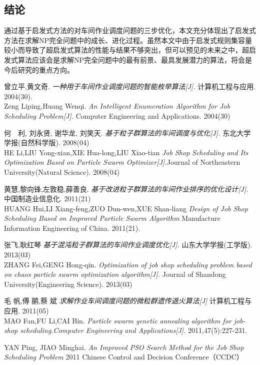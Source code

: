 \documentclass[UTF8]{ctexart}
\begin{document}
\begin{multicols}{2}
\section{结论}
	通过基于启发式方法的对车间作业调度问题的三步优化，本文充分体现出了启发式方法在求解NP完全问题中的成长、进化过程。虽然本文中由于启发式规则集容量较小而导致了超启发式算法的性能与结果不够突出，但可以预见的未来之中，超启发式算法应该会是求解NP完全问题中的最有前景、最具发展潜力的算法，将会是今后研究的重点方向。
\end{multicols}

\medskip
\begin{thebibliography}{9}
曾立平,黄文奇.
\textit{一种用于车间作业调度问题的智能枚举算法[J].} 
计算机工程与应用. 2004(30).\\
Zeng Liping,Huang Wenqi.
\textit{An Intelligent Enumeration Algorithm for Job Scheduling Problem[J].}
Computer Engineering and Applications. 2004(30)

何　利, 刘永贤, 谢华龙, 刘笑天.
\textit{基于粒子群算法的车间调度与优化[J].}
 东北大学学报(自然科学版). 2008(04)\\
HE Li,LIU Yong-xian,XIE Hua-long,LIU Xiao-tian
\textit{Job Shop Scheduling and Its Optimization Based on Particle
Swarm Optimizer[J].}Journal of Northeastern University(Natural Science). 2008(04)
 
黄慧,黎向锋,左敦稳,薛善良.
\textit{基于改进粒子群算法的车间作业排序的优化设计[J].}
中国制造业信息化. 2011(21)\\
HUANG Hui,LI Xiang-feng,ZUO Dun-wen,XUE Shan-liang
\textit{Design of Job Shop Scheduling Based on Improved Particle Swarm Algorithm}
Manufacture Information Engineering of China. 2011(21).

张飞,耿红琴
\textit{基于混沌粒子群算法的车间作业调度优化[J].}
山东大学学报(工学版). 2013(03)\\
ZHANG Fei,GENG Hong-qin.
\textit{Optimization of job shop scheduling problem based on chaos particle swarm optimization algorithm[J].}
Journal of Shandong University(Engineering Science). 2013(03)

毛 帆,傅 鹂,蔡 斌
\textit{求解作业车间调度问题的微粒群遗传退火算法[J]}
计算机工程与应用. 2011(05)\\
MAO Fan,FU Li,CAI Bin.
\textit{Particle swarm genetic annealing algorithm for job-shop scheduling.Computer Engineering and Applications[J].}
2011,47(5):227-231.

YAN Ping, JIAO Minghai.
\textit{An Improved PSO Search Method for the Job Shop Scheduling Problem}
2011 Chinese Control and Decision Conference（CCDC）


\end{thebibliography}
\end{document}
